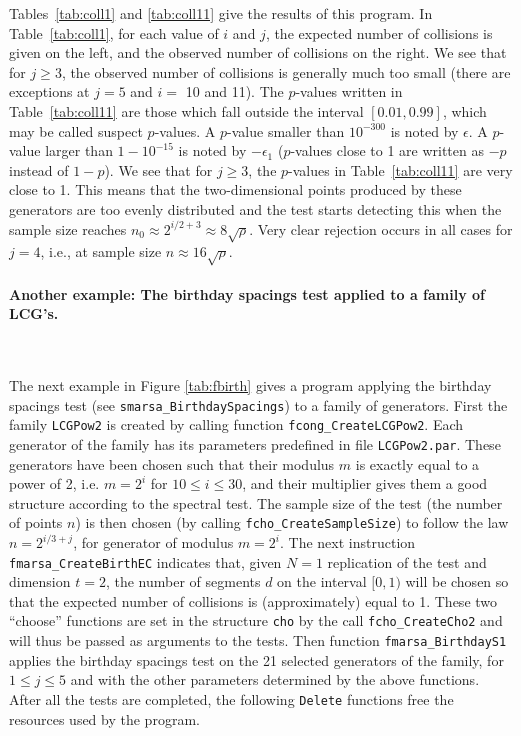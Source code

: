 

Tables~\ref{tab:coll1} and \ref{tab:coll11} give the results
of this program.
In Table~\ref{tab:coll1}, for each value of $i$ and $j$, the expected
number of collisions is given on the left, and the observed number of
collisions on the right.
We see that for $j\ge 3$, the observed number of collisions is generally
much too small (there are exceptions at $j=5$ and $i =$ 10 and 11).
The $p$-values written in Table~\ref{tab:coll11} are those which fall
outside the interval $[0.01, 0.99]$, which may be called suspect $p$-values.
A $p$-value smaller than $10^{-300}$ is noted by $\epsilon$.
A $p$-value larger than $1 - 10^{-15}$ is noted by $-\epsilon_1$
($p$-values close to 1 are written as $-p$ instead of $1-p$).
We see that for $j\ge 3$, the $p$-values in Table~\ref{tab:coll11}
are very close to 1.
This means that the two-dimensional points produced by these generators
are too evenly distributed and the test starts detecting this when the
sample size reaches $n_0 \approx 2^{i/2 + 3} \approx 8 \sqrt{\rho}$.
Very clear rejection occurs in all cases for $j=4$, i.e., at sample size
$n \approx 16 \sqrt{\rho}$.





\paragraph*{Another example: The {birthday spacings} test applied
  to a family of LCG's.} \

The next example in Figure \ref{tab:fbirth} gives a program applying the 
{birthday spacings} test (see {\tt smarsa\_BirthdaySpacings}) to a
family of generators. 
First the family {\tt LCGPow2} is created by calling
function {\tt fcong\_CreateLCGPow2}. Each generator of the family
has its parameters predefined in file {\tt LCGPow2.par}. These generators 
have been chosen such that their modulus $m$ is exactly equal to a power of 2,
i.e. $m = 2^i$ for $10 \le i \le 30$, and their multiplier
gives them a good structure according to the spectral test.
The sample size of the test (the number of points $n$) is then chosen 
(by calling {\tt fcho\_CreateSampleSize}) to follow the law $n = 2^{i/3 + j}$, 
for generator of modulus $m=2^i$. 
The next instruction {\tt fmarsa\_CreateBirthEC} indicates that, given
$N=1$ replication of the test and dimension $t=2$, the number of segments $d$
on the interval $[0, 1)$ will be chosen so that the expected
number of collisions is (approximately) equal to 1.
These two ``choose'' functions are set in the structure {\tt cho} by the call
{\tt fcho\_CreateCho2} and will thus be
 passed as arguments to the tests.
Then function {\tt fmarsa\_BirthdayS1} applies the birthday spacings test
on the 21 selected generators of the family, for $1 \le j \le 5$ and with the 
other parameters determined by the above functions. After all the tests are
completed, the following {\tt Delete} functions free the resources used
by the program.



